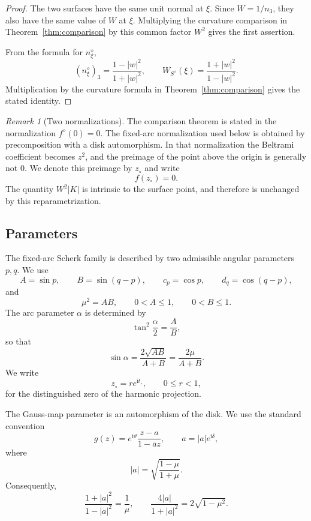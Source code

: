 \documentclass[11pt]{amsart}
\theoremstyle{remark}
\newtheorem{remark}[theorem]{Remark}
\newcommand{\ii}{\mathrm i}
\newcommand{\zc}{z_\circ}
\numberwithin{equation}{section}
\begin{document}
\begin{proof}
The two surfaces have the same unit normal at $\xi$. Since $W=1/n_3$, they also have the same value of $W$ at $\xi$. Multiplying the curvature comparison in Theorem~\ref{thm:comparison} by this common factor $W^2$ gives the first assertion.

From the formula for $n^\diamond_\xi$,
\[
        (n^\diamond_\xi)_3=\frac{1-|w|^2}{1+|w|^2},
        \qquad
        W_{S^\diamond}(\xi)=\frac{1+|w|^2}{1-|w|^2}.
\]
Multiplication by the curvature formula in Theorem~\ref{thm:comparison} gives the stated identity.
\end{proof}

\begin{remark}[Two normalizations]\label{rem:normalizations}
The comparison theorem is stated in the normalization $f^\diamond(0)=0$. The fixed-arc normalization used below is obtained by precomposition with a disk automorphism. In that normalization the Beltrami coefficient becomes $z^2$, and the preimage of the point above the origin is generally not $0$. We denote this preimage by $\zc$ and write
\[
        f(\zc)=0.
\]
The quantity $W^2|K|$ is intrinsic to the surface point, and therefore is unchanged by this reparametrization.
\end{remark}

\subsection{Parameters}

The fixed-arc Scherk family is described by two admissible angular parameters $p,q$. We use
\[
        A=\sin p,
        \qquad
        B=\sin(q-p),
        \qquad
        c_p=\cos p,
        \qquad
        d_q=\cos(q-p),
\]
and
\[
        \mu^2=AB,
        \qquad
        0<A\leq 1,
        \qquad
        0<B\leq 1.
\]
The arc parameter $\alpha$ is determined by
\[
        \tan^2\frac{\alpha}{2}=\frac{A}{B},
\]
so that
\[
        \sin\alpha=\frac{2\sqrt{AB}}{A+B}=\frac{2\mu}{A+B}.
\]
We write
\[
        \zc=re^{\ii t_\circ},
        \qquad
        0\leq r<1,
\]
for the distinguished zero of the harmonic projection.

The Gauss-map parameter is an automorphism of the disk. We use the standard convention
\[
        g(z)=e^{\ii\vartheta}\frac{z-a}{1-\overline a z},
        \qquad
        a=|a|e^{\ii\delta},
\]
where
\[
        |a|=\sqrt{\frac{1-\mu}{1+\mu}}.
\]
Consequently,
\[
        \frac{1+|a|^2}{1-|a|^2}=\frac1\mu,
        \qquad
        \frac{4|a|}{1+|a|^2}=2\sqrt{1-\mu^2}.
\]
\end{document}
